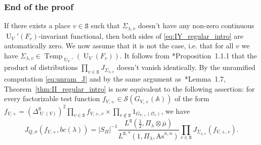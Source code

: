 \documentclass[letterpaper,11pt]{amsart}
\newcommand{\bA}{\mathbb{A}}
\newcommand{\cO}{\mathcal{O}}
\newcommand{\cS}{\mathcal{S}}
\newcommand{\tS}{\mathtt{S}}
\newcommand{\<}{\negthickspace}
\newcommand{\valP}[1]{\left|#1\right|}
\DeclareMathOperator{\U}{U}
\DeclareMathOperator{\Temp}{Temp} \DeclareMathOperator{\temp}{temp}
\theoremstyle{definition}
\theoremstyle{plain}
\theoremstyle{remark}
\numberwithin{equation}{section}
\begin{document}
\subsubsection{End of the proof}

If there exists a place $v \in \tS$ such that $\Sigma_{\lambda,v}$ doesn't have any non-zero continuous $\U_V'(F_v)$-invariant functional, then both sides of \eqref{eq:IY_regular_intro} are automatically zero. We now assume that it is not the case, i.e. that for all $v$ we have $\Sigma_{\lambda,v} \in \Temp_{\U_V'}(\U_V(F_v))$. It follows from \cite{Xue2}*{Proposition~1.1.1} that the product of distributions $\prod_{v \in \tS} J_{\Sigma_{\lambda,v}}$ doesn't vanish identically. By the unramified computation \eqref{eq:unram_J} and by the same argument as~\cite{Zhang2}*{Lemma~1.7}, Theorem~\ref{thm:II_regular_intro} is now equivalent to the following assertion: for every factorizable test function $f_{V,+} \in \cS(G_{V,+}(\bA))$ of the form $f_{V,+}=(\Delta_{\U(V)}^{\tS})^2 \prod_{v \in \tS} f_{V,+,v} \times \prod_{v \notin \tS} 1_{G_{V,+}(\cO_v)}$, we have
\begin{equation}
\label{eq:reformulation}
    J_{Q,\sigma}(f_{V,+},bc(\lambda))=\valP{S_\Pi}^{-1} \frac{L^{\tS}(\frac{1}{2},\Pi_\lambda \otimes \overline{\mu})}{L^{\tS,*}(1,\Pi_\lambda, \mathrm{As}^{n,n})}\prod_{v \in \tS}J_{\Sigma_{\lambda,v}}(f_{V,+,v}).
\end{equation}
\end{document}
